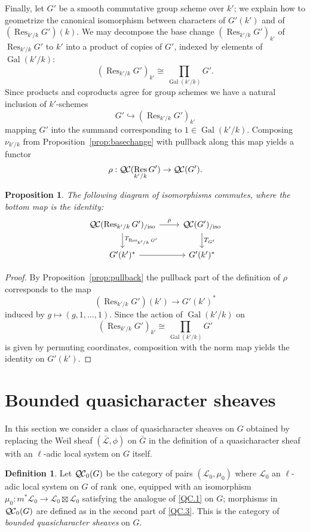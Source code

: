 \documentclass{amsart}
\theoremstyle{plain}
\newtheorem{proposition}[theorem]{Proposition}
\theoremstyle{definition}
\newtheorem{definition}[theorem]{Definition}
\theoremstyle{remark}
\DeclareMathOperator{\Gal}{Gal}
\DeclareMathOperator{\Res}{Res}
\newcommand{\qcs}[1]{{\mathcal{#1}}}
\newcommand{\gqcs}[1]{{\mathcal{\bar #1}}}
\newcommand{\QC}{{\mathcal{Q\hskip-0.8pt C}}}
\newcommand{\QCb}{{\QC_0}}
\newcommand{\QCiso}[1]{\QC(#1)_{/\text{iso}}}
\newcommand{\TrFrob}[1]{T_{#1}}
\newcommand{\bG}{\bar{G}}
\begin{document}
Finally, let $G'$ be a smooth commutative group scheme over $k'$;
we explain how to geometrize the canonical isomorphism between characters of $G'(k')$ and of $(\Res_{k'/k}G')(k)$.
We may decompose the base change $(\Res_{k'/k}G')_{k'}$ of $\Res_{k'/k}G'$ to $k'$
into a product of copies of $G'$, indexed by elements of $\Gal(k'/k)$:
\[
(\Res_{k'/k}G')_{k'} \cong \prod_{\Gal(k'/k)} G'.
\]
Since products and coproducts agree for group schemes we have a natural inclusion of $k'$-schemes
\[
G' \hookrightarrow (\Res_{k'/k}G')_{k'}
\]
mapping $G'$ into the summand corresponding to $1 \in \Gal(k'/k)$.  Composing $\nu_{k'/k}$
from Proposition~\ref{prop:basechange} with pullback along this map yields a functor
\[
\rho : \QC(\Res_{k'/k}G') \to \QC(G').
\]

\begin{proposition}
The following diagram of isomorphisms commutes, where the bottom map is the identity:
\[
\begin{tikzcd}
\QCiso{\Res_{k'/k} G'} \dar{\TrFrob{\Res_{k'/k} G'}} \rar{\rho} & \QCiso{G'} \dar{\TrFrob{G'}}\\
G'(k')^* \rar & G'(k')^*
\end{tikzcd}
\]
\end{proposition}
\begin{proof}
By Proposition~\ref{prop:pullback} the pullback part of the definition of $\rho$ corresponds to the map
\[
(\Res_{k'/k}G')(k') \to G'(k')^*
\]
induced by $g \mapsto (g, 1, \ldots, 1)$.  Since the action of $\Gal(k'/k)$ on
\[
(\Res_{k'/k}G')_{k'} \cong \prod_{\Gal(k'/k)} G'
\]
is given by permuting coordinates, composition with the norm map yields the identity on $G'(k')$.
\end{proof}

\section{Bounded quasicharacter sheaves}\label{sec:bounded}

In this section we consider a class of quasicharacter sheaves on $G$ obtained by
replacing the Weil sheaf $(\gqcs{L}, \phi)$ on $\bG$ in the definition of a quasicharacter
sheaf with an $\ell$-adic local system on $G$ itself.

\begin{definition}
Let $\QCb(G)$ be the category of pairs $(\qcs{L}_0,\mu_0)$
where $\qcs{L}_0$ an $\ell$-adic local system on $G$ of rank~one,
equipped with an isomorphism $\mu_0 : m^* \qcs{L}_0 \to \qcs{L}_0 \boxtimes \qcs{L}_0$
satisfying the analogue of \ref{QC.1} on $G$;
morphisms in $\QCb(G)$ are defined as in the second part of
\ref{QC.3}.
This is the category of \emph{bounded quasicharacter sheaves} on $G$.
\end{definition}
\end{document}
